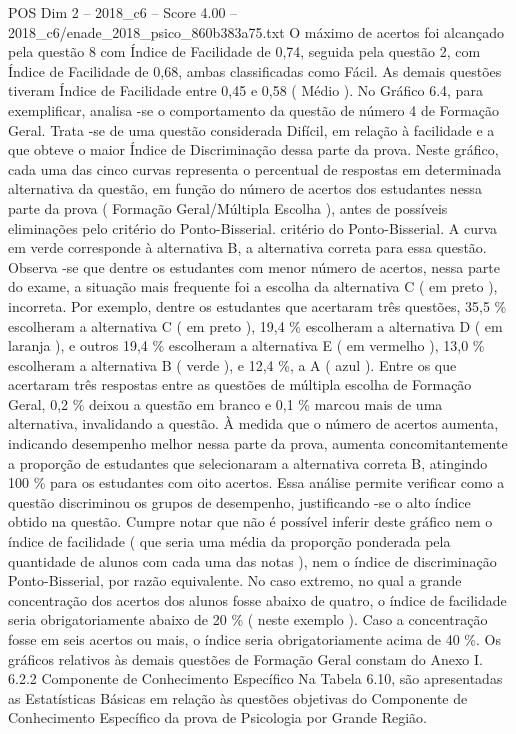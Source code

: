 \begin{textsample}{POS Dim 2 – 2018\_c6 – Score 4.00 – 2018\_c6/enade\_2018\_psico\_860b383a75.txt}
O máximo de acertos foi alcançado pela questão 8 com Índice de Facilidade de 0,74, seguida pela questão 2, com Índice de Facilidade de 0,68, ambas classificadas como Fácil.
As demais questões tiveram Índice de Facilidade entre 0,45 e 0,58 ( Médio ).
No Gráfico 6.4, para exemplificar, analisa -se o comportamento da questão de número 4 de Formação Geral.
Trata -se de uma questão considerada Difícil, em relação à facilidade e a que obteve o maior Índice de Discriminação dessa parte da prova.
Neste gráfico, cada uma das cinco curvas representa o percentual de respostas em determinada alternativa da questão, em função do número de acertos dos estudantes nessa parte da prova ( Formação Geral/Múltipla Escolha ), antes de possíveis eliminações pelo critério do Ponto-Bisserial. critério do Ponto-Bisserial.
A curva em verde corresponde à alternativa B, a alternativa correta para essa questão.
Observa -se que dentre os estudantes com menor número de acertos, nessa parte do exame, a situação mais frequente foi a escolha da alternativa C ( em preto ), incorreta.
Por exemplo, dentre os estudantes que acertaram três questões, 35,5 \% escolheram a alternativa C ( em preto ), 19,4 \% escolheram a alternativa D ( em laranja ), e outros 19,4 \% escolheram a alternativa E ( em vermelho ), 13,0 \% escolheram a alternativa B ( verde ), e 12,4 \%, a A ( azul ).
Entre os que acertaram três respostas entre as questões de múltipla escolha de Formação Geral, 0,2 \% deixou a questão em branco e 0,1 \% marcou mais de uma alternativa, invalidando a questão.
À medida que o número de acertos aumenta, indicando desempenho melhor nessa parte da prova, aumenta concomitantemente a proporção de estudantes que selecionaram a alternativa correta B, atingindo 100 \% para os estudantes com oito acertos.
Essa análise permite verificar como a questão discriminou os grupos de desempenho, justificando -se o alto índice obtido na questão.
Cumpre notar que não é possível inferir deste gráfico nem o índice de facilidade ( que seria uma média da proporção ponderada pela quantidade de alunos com cada uma das notas ), nem o índice de discriminação Ponto-Bisserial, por razão equivalente.
No caso extremo, no qual a grande concentração dos acertos dos alunos fosse abaixo de quatro, o índice de facilidade seria obrigatoriamente abaixo de 20 \% ( neste exemplo ).
Caso a concentração fosse em seis acertos ou mais, o índice seria obrigatoriamente acima de 40 \%.
Os gráficos relativos às demais questões de Formação Geral constam do Anexo I. 6.2.2 Componente de Conhecimento Específico Na Tabela 6.10, são apresentadas as Estatísticas Básicas em relação às questões objetivas do Componente de Conhecimento Específico da prova de Psicologia por Grande Região.

\end{textsample}
